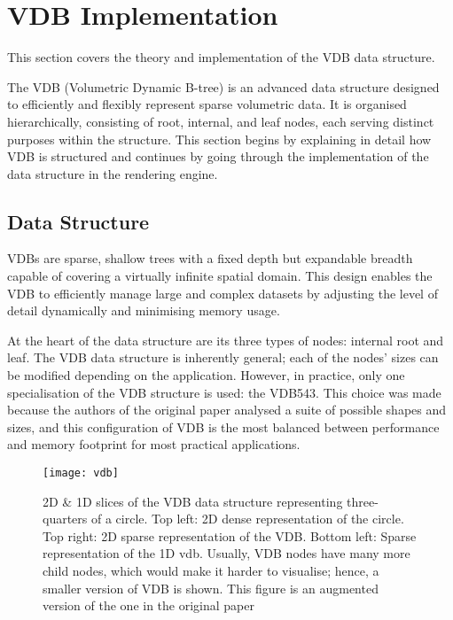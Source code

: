 \section{VDB Implementation}\label{vdb:sec}

This section covers the theory and implementation of the VDB data structure.

The VDB (Volumetric Dynamic B-tree) is an advanced data structure designed to efficiently and flexibly represent sparse volumetric data. It is organised hierarchically, consisting of root, internal, and leaf nodes, each serving distinct purposes within the structure. This section begins by explaining in detail how VDB is structured and continues by going through the implementation of the data structure in the rendering engine.

\subsection{Data Structure}
\label{vdb:ds}

VDBs are sparse, shallow trees with a fixed depth but expandable breadth capable of covering a virtually infinite spatial domain. This design enables the VDB to efficiently manage large and complex datasets by adjusting the level of detail dynamically and minimising memory usage.

At the heart of the data structure are its three types of nodes: internal root and leaf. The VDB data structure is inherently general; each of the nodes' sizes can be modified depending on the application. However, in practice, only one specialisation of the VDB structure is used: the VDB543. This choice was made because the authors of the original paper\supercite{vdb2013} analysed a suite of possible shapes and sizes, and this configuration of VDB is the most balanced between performance and memory footprint for most practical applications.

\begin{figure}[H]
  \centering
  \vspace{-1cm}
  \texttt{[image: vdb]}
  \vspace*{-2cm}
  \caption{2D \& 1D slices of the VDB data structure representing three-quarters of a circle. Top left: 2D dense representation of the circle. Top right: 2D sparse representation of the VDB. Bottom left: Sparse representation of the 1D vdb. Usually, VDB nodes have many more child nodes, which would make it harder to visualise; hence, a smaller version of VDB is shown. This figure is an augmented version of the one in the original paper\supercite{vdb2013}}
\end{figure}

